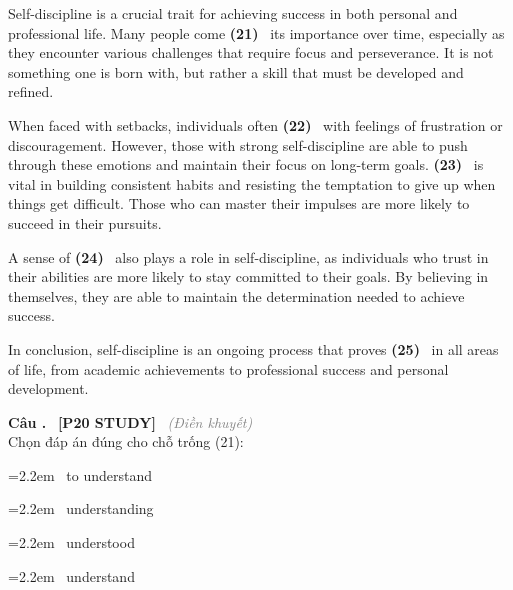 \documentclass[12pt,a4paper,twoside]{article}
\newcounter{qcounter}
\newcommand{\question}[2][]{%
    \stepcounter{qcounter}%
    \par\vspace{6pt}%
    \noindent\textcolor{primaryBlue}{\textbf{Câu \theqcounter.}}~%
    \textcolor{secondaryBlue}{\small\textbf{[P20 STUDY]}}~%
    \if\relax\detokenize{#1}\relax\else\textcolor{gray}{\small\textit{(#1)}}~\fi\\[1pt]
    \noindent #2%
}
\newcommand{\choiceitem}[2]{%
    \tikz[baseline=-0.5ex]{%
        \node[draw=primaryBlue, circle, minimum size=1.5em, inner sep=0pt, thick] {\textbf{#1}};%
    }~#2%
}
\newenvironment{readingpassage}[1][]{%
    \begin{tcolorbox}[enhanced, colback=grayLight, colframe=secondaryBlue,
        coltitle=textDark, fonttitle=\bfseries, title={#1},
        rounded corners, arc=3mm, boxrule=1pt,
        left=15pt, right=15pt, top=10pt, bottom=10pt,
        breakable, before skip=10pt, after skip=10pt, drop fuzzy shadow]
    \setstretch{1.3}
}{\end{tcolorbox}}
\begin{document}
\begin{readingpassage}[]
Self-discipline is a crucial trait for achieving success in both personal and professional life. Many people come \textbf{(21)}~\underline{\hspace{1.3cm}} its importance over time, especially as they encounter various challenges that require focus and perseverance. It is not something one is born with, but rather a skill that must be developed and refined.

When faced with setbacks, individuals often \textbf{(22)}~\underline{\hspace{1.3cm}} with feelings of frustration or discouragement. However, those with strong self-discipline are able to push through these emotions and maintain their focus on long-term goals. \textbf{(23)}~\underline{\hspace{1.3cm}} is vital in building consistent habits and resisting the temptation to give up when things get difficult. Those who can master their impulses are more likely to succeed in their pursuits.

A sense of \textbf{(24)}~\underline{\hspace{1.3cm}} also plays a role in self-discipline, as individuals who trust in their abilities are more likely to stay committed to their goals. By believing in themselves, they are able to maintain the determination needed to achieve success.

In conclusion, self-discipline is an ongoing process that proves \textbf{(25)}~\underline{\hspace{1.3cm}} in all areas of life, from academic achievements to professional success and personal development.
\end{readingpassage}

\question[Điền khuyết]{Chọn đáp án đúng cho chỗ trống (21):}

\par\vspace{4pt}
\noindent\hangindent=2.2em\choiceitem{A}{to understand}\par\vspace{4pt}
\noindent\hangindent=2.2em\choiceitem{B}{understanding}\par\vspace{4pt}
\noindent\hangindent=2.2em\choiceitem{C}{understood}\par\vspace{4pt}
\noindent\hangindent=2.2em\choiceitem{D}{understand}\par\vspace{4pt}
\end{document}
